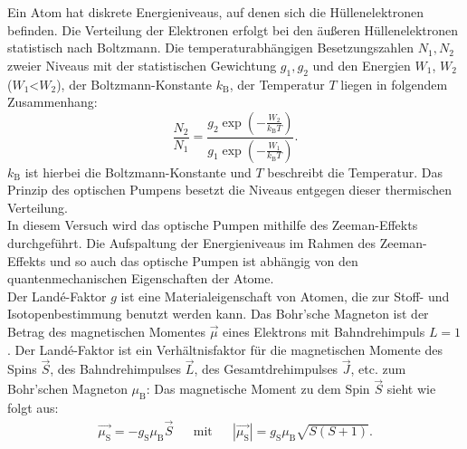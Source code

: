 %
Ein Atom hat diskrete Energieniveaus, auf denen sich die Hüllenelektronen befinden.
Die Verteilung der Elektronen erfolgt bei den äußeren Hüllenelektronen statistisch nach Boltzmann.
Die temperaturabhängigen Besetzungszahlen $N_{1}, N_{2}$ zweier Niveaus mit der statistischen Gewichtung $g_{1}, g_{2}$ und den Energien $W_{1}$, $W_{2}$ ($W_{1}$<$W_{2}$), der Boltzmann-Konstante $k_\text{B}$, der Temperatur $T$ liegen in folgendem Zusammenhang:
\begin{equation*}
  \frac{N_{2}}{N_{1}} = \frac{ g_{2} \exp{  \left( -\frac{W_{2}}{k_{\text{B}} T}  \right) }}{ g_{1} \exp{ \left( -\frac{W_{1}}{k_{\text{B}} T } \right) }}.
\end{equation*}
$k_{\text{B}}$ ist hierbei die Boltzmann-Konstante und $T$ beschreibt die Temperatur.
Das Prinzip des optischen Pumpens besetzt die Niveaus entgegen dieser thermischen Verteilung.\\
In diesem Versuch wird das optische Pumpen mithilfe des Zeeman-Effekts durchgeführt.
Die Aufspaltung der Energieniveaus im Rahmen des Zeeman-Effekts und so auch das optische Pumpen ist abhängig von den quantenmechanischen Eigenschaften der Atome.
%
%
\\Der Landé-Faktor $g$ ist eine Materialeigenschaft von Atomen, die zur Stoff- und Isotopenbestimmung benutzt werden kann.
Das Bohr'sche Magneton ist der Betrag des magnetischen Momentes $\vec{\mu}$ eines Elektrons mit Bahndrehimpuls $L=1$.
Der Landé-Faktor ist ein Verhältnisfaktor für die magnetischen Momente des Spins $\vec{S}$, des Bahndrehimpulses $\vec{L}$, des Gesamtdrehimpulses $\vec{J}$, etc. zum Bohr'schen Magneton $\mu_{\text{B}}$:
Das magnetische Moment zu dem Spin $\vec{S}$ sieht wie folgt aus:
\begin{align*}
  \vec{\mu_{\text{S}}} = - g_{\text{S}} \mu_{\text{B}} \vec{S} && \text{mit} && |\vec{\mu_{\text{S}}}|= g_{\text{S}} \mu_{\text{B}} \sqrt{S(S+1)}.\\
\end{align*}
